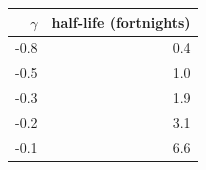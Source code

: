 \begin{tabular}{rr}
\toprule
$\gamma$ & half-life (fortnights) \\
\midrule
-0.8 & 0.4 \\
-0.5 & 1.0 \\
-0.3 & 1.9 \\
-0.2 & 3.1 \\
-0.1 & 6.6 \\
\bottomrule
\end{tabular}